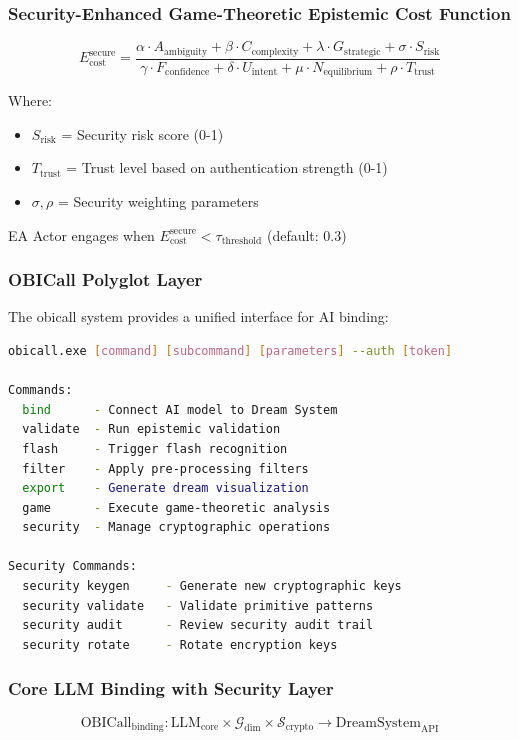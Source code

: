 \documentclass[12pt,a4paper]{article}
\begin{document}
\subsubsection{Security-Enhanced Game-Theoretic Epistemic Cost Function}

\begin{equation}
E_{\text{cost}}^{\text{secure}} = \frac{\alpha \cdot A_{\text{ambiguity}} + \beta \cdot C_{\text{complexity}} + \lambda \cdot G_{\text{strategic}} + \sigma \cdot S_{\text{risk}}}{\gamma \cdot F_{\text{confidence}} + \delta \cdot U_{\text{intent}} + \mu \cdot N_{\text{equilibrium}} + \rho \cdot T_{\text{trust}}}
\end{equation}

Where:
\begin{itemize}
    \item $S_{\text{risk}}$ = Security risk score (0-1)
    \item $T_{\text{trust}}$ = Trust level based on authentication strength (0-1)
    \item $\sigma, \rho$ = Security weighting parameters
\end{itemize}

EA Actor engages when $E_{\text{cost}}^{\text{secure}} < \tau_{\text{threshold}}$ (default: 0.3)

\subsubsection{OBICall Polyglot Layer}
The \gls{obicall} system provides a unified interface for AI binding:

\begin{lstlisting}[language=bash, caption=OBICall Command Structure with Security]
obicall.exe [command] [subcommand] [parameters] --auth [token]

Commands:
  bind      - Connect AI model to Dream System
  validate  - Run epistemic validation
  flash     - Trigger flash recognition
  filter    - Apply pre-processing filters
  export    - Generate dream visualization
  game      - Execute game-theoretic analysis
  security  - Manage cryptographic operations
  
Security Commands:
  security keygen     - Generate new cryptographic keys
  security validate   - Validate primitive patterns
  security audit      - Review security audit trail
  security rotate     - Rotate encryption keys
\end{lstlisting}

\subsubsection{Core LLM Binding with Security Layer}
\begin{equation}
\text{OBICall}_{\text{binding}} : \text{LLM}_{\text{core}} \times \mathcal{G}_{\text{dim}} \times \mathcal{S}_{\text{crypto}} \rightarrow \text{DreamSystem}_{\text{API}}
\end{equation}
\end{document}

